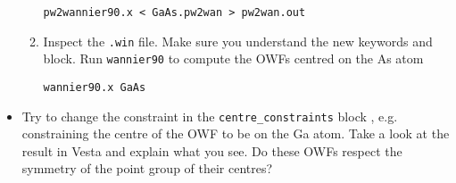 \documentclass[a4paper,11pt,twoside]{article}
\begin{document}
\begin{itemize}
\begin{enumerate}
\begin{itemize}
\end{itemize}


\verb|pw2wannier90.x < GaAs.pw2wan > pw2wan.out|

\item Inspect the {\tt .win} file. Make sure you understand the new keywords and block. Run {\tt wannier90} to  compute the OWFs centred on the As atom

\verb|wannier90.x GaAs|

\end{enumerate}

\item Try to change the constraint in the {\tt centre_constraints} block , e.g. constraining the centre of the OWF to be on the Ga atom. Take a look at the result in Vesta and explain what you see. Do these OWFs respect the symmetry of the point group of their centres? 


\end{itemize}




\end{document}
